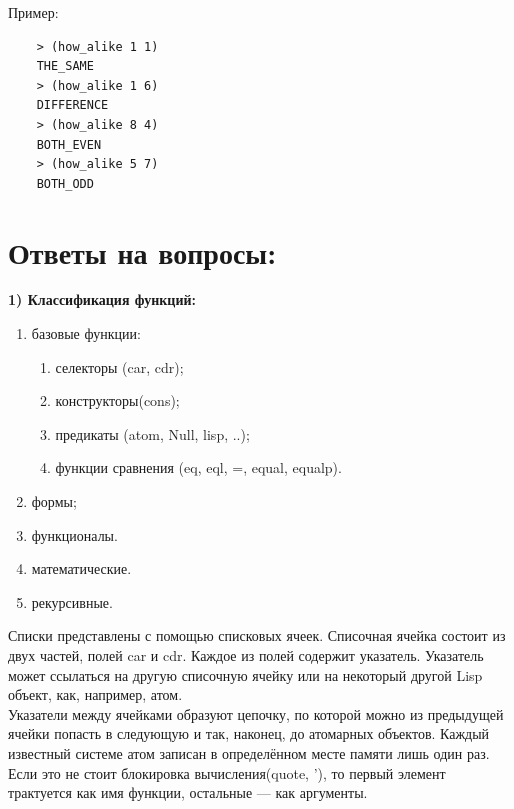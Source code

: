 \documentclass[a4paper, 12pt]{article}
\begin{document}
Пример:
\begin{lstlisting}
	> (how_alike 1 1)
	THE_SAME
	> (how_alike 1 6)
	DIFFERENCE
	> (how_alike 8 4)
	BOTH_EVEN
	> (how_alike 5 7)
	BOTH_ODD
\end{lstlisting}

\section*{Ответы на вопросы:}
\hspace*{-7mm} \textbf{1) Классификация функций:}
\begin{enumerate}
	\item базовые функции:
	\begin{enumerate}
		\item селекторы (car, cdr);
		\item конструкторы(cons);
		\item предикаты (atom, Null, lisp, ..);
		\item функции сравнения (eq, eql, =, equal, equalp).
	\end{enumerate}
	\item формы;
	\item функционалы.
	\item математические.
	\item рекурсивные.
\end{enumerate}
\hspace*{-6mm}Списки представлены с помощью списковых ячеек. Списочная ячейка состоит из двух частей, полей car и cdr. Каждое из полей содержит указатель. Указатель может ссылаться на другую списочную ячейку или на некоторый другой Lisp объект, как, например, атом.
\\ Указатели между ячейками образуют цепочку, по которой можно из предыдущей ячейки попасть в следующую и так, наконец, до атомарных объектов. Каждый известный системе атом записан в определённом месте памяти лишь один раз.
\\Если это  не стоит блокировка вычисления(quote, '), то первый элемент трактуется как имя функции, остальные — как аргументы.
\end{document}
